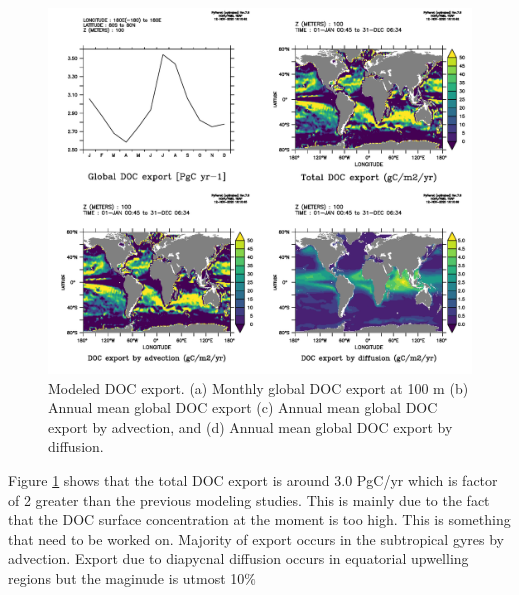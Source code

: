 \documentclass[a4paper]{article}
\begin{document}
\begin{enumerate}
\begin{figure}[h!]   %
   \centering
   \includegraphics[scale=0.6]{doc_global.pdf}
   \caption[]{Modeled DOC export. (a) Monthly global DOC export at 100 m (b) Annual mean global DOC export (c) Annual mean global DOC export by advection, and (d) Annual mean global DOC export by diffusion.}
   \label{fig:doc_global}
\end{figure}

Figure \ref{fig:doc_global} shows that the total DOC export is around 3.0 PgC/yr which is factor of 2 greater than the previous modeling studies. This is mainly due to the fact that the DOC surface concentration at the moment is too high. This is something that need to be worked on. Majority of export occurs in the subtropical gyres by advection. Export due to diapycnal diffusion occurs in equatorial upwelling regions but the maginude is utmost 10$\%$


\end{enumerate}
\end{document}
